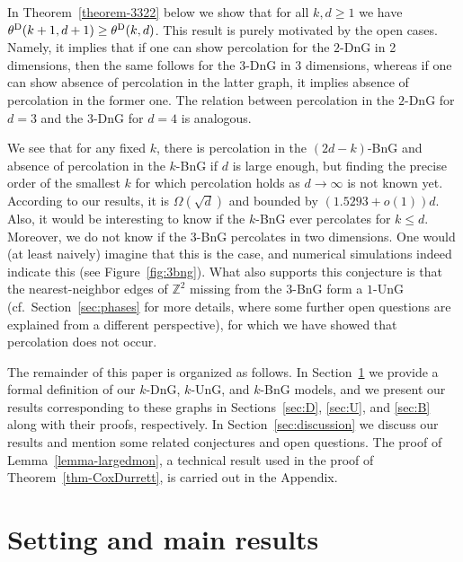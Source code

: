 \documentclass[oneside]{amsart}
\theoremstyle{definition}
\newcommand{\1}{\mathbbm{1}}
\newcommand{\0}{\mathbf{o}}
\newcommand{\Z}{\mathbb{Z}}
\numberwithin{equation}{section}
\begin{document}
In Theorem~\ref{theorem-3322} below we show that for all $k, d \geq 1$ we have $\theta^{\rm D} (k+1, d+1) \geq \theta^{\rm D}(k,d)$. This result is purely motivated by the open cases. Namely, it implies that if one can show percolation for the $2$-DnG in 2 dimensions, then the same follows for the $3$-DnG in 3 dimensions, whereas if one can show absence of percolation in the latter graph, it implies absence of percolation in the former one. The relation between percolation in the $2$-DnG for $d=3$ and the $3$-DnG for $d=4$ is analogous. 

We see that for any fixed $k$, there is percolation in the $(2d-k)$-BnG and absence of percolation in the $k$-BnG if $d$ is large enough, but finding the precise order of the smallest $k$ for which percolation holds as $d \to \infty$ is not known yet. According to our results, it is $\Omega(\sqrt d)$ and bounded by $(1.5293+o(1))d$. Also, it would be interesting to know if the $k$-BnG ever percolates for $k \leq d$. Moreover, we do not know if the $3$-BnG percolates in two dimensions. One would (at least naively) imagine that this is the case, and numerical simulations indeed indicate this (see Figure~\ref{fig:3bng}). What also supports this conjecture is that the nearest-neighbor edges of $\Z^2$ missing from the $3$-BnG form a $1$-UnG (cf.~Section~\ref{sec:phases} for more details, where some further open questions are explained from a different perspective), for which we have showed that percolation does not occur. 

The remainder of this paper is organized as follows. In Section~\ref{sec:set} we provide a formal definition of our $k$-DnG,  $k$-UnG, and $k$-BnG models, and we present our results corresponding to these graphs in Sections~\ref{sec:D}, \ref{sec:U}, and \ref{sec:B} along with their proofs, respectively. In Section~\ref{sec:discussion} we discuss our results and mention some related conjectures and open questions. The proof of Lemma~\ref{lemma-largedmon}, a technical result used in the proof of Theorem~\ref{thm-CoxDurrett}, is carried out in the Appendix.

\section{Setting and main results}\label{sec:set}
\end{document}
